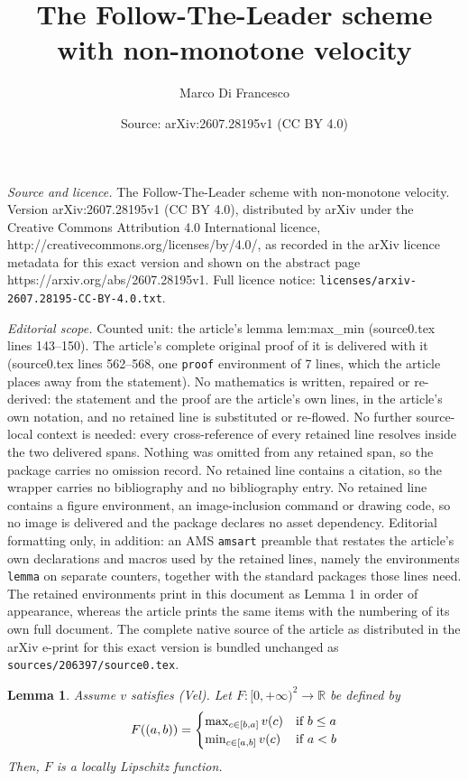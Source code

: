 \documentclass[10pt,a4paper]{amsart}
\title{The Follow-The-Leader scheme with non-monotone velocity}
\author{Marco Di Francesco}
\date{Source: arXiv:2607.28195v1 (CC BY 4.0)}
\newtheorem{lemma}{Lemma}
\newcommand{\R}{\mathbb{R}}
\begin{document}
\maketitle

\noindent\emph{Source and licence.} The Follow-The-Leader scheme with non-monotone velocity. Version arXiv:2607.28195v1 (CC BY 4.0), distributed by arXiv under the Creative Commons Attribution 4.0 International licence, http://creativecommons.org/licenses/by/4.0/, as recorded in the arXiv licence metadata for this exact version and shown on the abstract page https://arxiv.org/abs/2607.28195v1. Full licence notice: \texttt{licenses/arxiv-2607.28195-CC-BY-4.0.txt}.\par\smallskip

\noindent\textit{Editorial scope.} Counted unit: the article's lemma lem:max\_min (source0.tex lines 143--150). The article's complete original proof of it is delivered with it (source0.tex lines 562--568, one \texttt{proof} environment of 7 lines, which the article places away from the statement). No mathematics is written, repaired or re-derived: the statement and the proof are the article's own lines, in the article's own notation, and no retained line is substituted or re-flowed.  No further source-local context is needed: every cross-reference of every retained line resolves inside the two delivered spans.  Nothing was omitted from any retained span, so the package carries no omission record.  No retained line contains a citation, so the wrapper carries no bibliography and no bibliography entry.  No retained line contains a figure environment, an image-inclusion command or drawing code, so no image is delivered and the package declares no asset dependency.  Editorial formatting only, in addition: an AMS \texttt{amsart} preamble that restates the article's own declarations and macros used by the retained lines, namely the environments \texttt{lemma} on separate counters, together with the standard packages those lines need.  The retained environments print in this document as Lemma 1 in order of appearance, whereas the article prints the same items with the numbering of its own full document.  The complete native source of the article as distributed in the arXiv e-print for this exact version is bundled unchanged as \texttt{sources/206397/source0.tex}.
\begin{lemma}\label{lem:max_min}
    Assume $v$ satisfies (Vel). Let $F:[0,+\infty)^2\rightarrow \R$ be defined by 
    \[F((a,b))=\begin{cases}
        \max_{c\in [b,a]}v(c) & \hbox{if $b\leq a$}\\
        \min_{c\in [a,b]}v(c) & \hbox{if $a<b$}
    \end{cases}\]
    Then, $F$ is a locally Lipschitz function.
\end{lemma}
\end{document}
